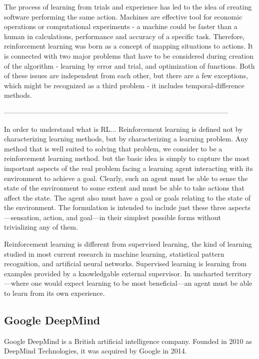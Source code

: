 \documentclass{article}
\begin{document}
The process of learning from trials and experience has led to the idea of creating software performing the same action. Machines are effective tool for economic operations or computational experiments - a machine could be faster than a human in calculations, performance and accuracy of a specific task. Therefore, reinforcement learning was born as a concept of mapping situations to actions. It is connected with two major problems that have to be considered during creation of the algorithm - learning by error and trial, and optimization of functions. Both of these issues are independent from each other, but there are a few exceptions, which might be recognized as a third problem - it includes temporal-difference methods. \cite[Ch.\ 1, p. 16]{sutton1998reinforcement}


------------------------------------------------------------------------------------------------


In order to understand what is RL...
Reinforcement learning is defined not by characterizing learning methods,
but by characterizing a learning problem. Any method that is well suited to
solving that problem, we consider to be a reinforcement learning method.
but the basic
idea is simply to capture the most important aspects of the real problem facing
a learning agent interacting with its environment to achieve a goal. Clearly,
such an agent must be able to sense the state of the environment to some extent
and must be able to take actions that affect the state. The agent also must
have a goal or goals relating to the state of the environment. The formulation
is intended to include just these three aspects—sensation, action, and goal—in
their simplest possible forms without trivializing any of them.\cite{sutton1998reinforcement}

Reinforcement learning is different from supervised learning, the kind of
learning studied in most current research in machine learning, statistical pattern
recognition, and artificial neural networks. Supervised learning is learning
from examples provided by a knowledgable external supervisor. In uncharted territory—where one would expect learning to be most beneficial—an agent must be able to learn from its
own experience. \cite{sutton1998reinforcement}


\subsection{Google DeepMind}
Google DeepMind is a British artificial intelligence company. Founded in 2010 as DeepMind Technologies, it was acquired by Google in 2014. 
\end{document}
